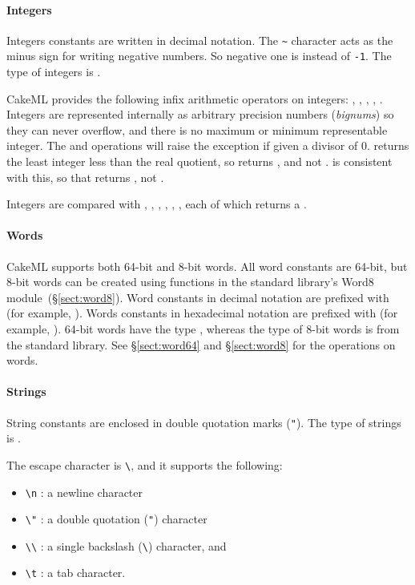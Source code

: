 \documentclass[12pt,a4paper]{book}
\begin{document}
\paragraph{Integers} Integers constants are written in decimal notation. The
\texttt{\textasciitilde} character acts as the minus sign for writing negative
numbers. So negative one is  instead of \texttt{-1}. The type of integers is
.

CakeML provides the following infix arithmetic operators on integers: \smlinline{+}, \smlinline{-}, \smlinline{*}, , . Integers are represented internally as arbitrary precision numbers (\emph{bignums}) so they can never overflow, and there is no maximum or minimum representable integer. The  and  operations will raise the  exception if given a divisor of 0.  returns the least integer less than the real quotient, so  returns , and not .  is consistent with this, so that  returns , not .

Integers are compared with \smlinline{=}, \smlinline{<>}, \smlinline{<}, \smlinline{>}, \smlinline{<=}, \smlinline{>=}, each of which returns a .

\paragraph{Words} CakeML supports both 64-bit and 8-bit words. All word
constants are 64-bit, but 8-bit words can be created using functions in the
standard library's Word8 module~(\S\ref{sect:word8}). Word constants in decimal
notation are prefixed with  (for example, ).
Words constants in hexadecimal notation are prefixed with  (for
example, ). 64-bit words have the type , whereas
the type of 8-bit words is  from the standard library.
See \S\ref{sect:word64} and \S\ref{sect:word8} for the operations on words.

\paragraph{Strings} String constants are enclosed in double quotation marks (\texttt{"}). The type of strings is .

The escape character is \verb|\|, and it supports the following:
\begin{itemize}
\item
\verb|\n| : a newline character
\item
\verb|\"| : a double quotation (\texttt{"}) character
\item
\verb|\\| : a single backslash (\verb|\|) character, and
\item
\verb|\t| : a tab character.
\end{itemize}
\end{document}
